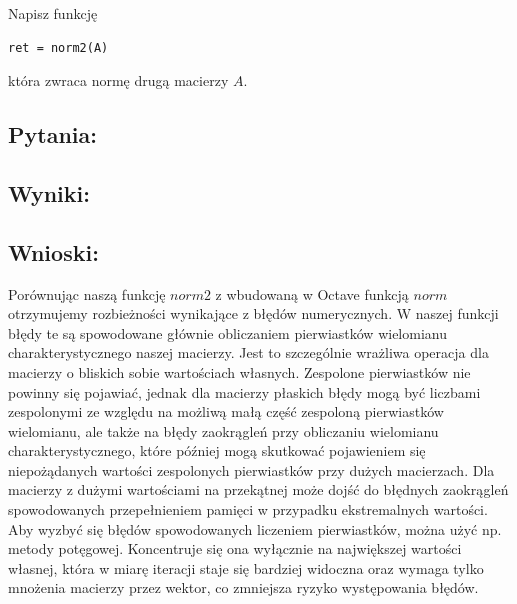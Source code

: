 \documentclass[a4paper, 11pt]{article}
\begin{document}
Napisz funkcję
\begin{center}
\begin{verbatim}
ret = norm2(A)
\end{verbatim}
\end{center}
która zwraca normę drugą macierzy \( A \).
\subsection{Pytania:} 

\subsection{Wyniki:} 

\subsection{Wnioski:}
Porównując naszą funkcję $norm2$ z wbudowaną w Octave funkcją $norm$ otrzymujemy rozbieżności wynikające z błędów numerycznych. W naszej funkcji błędy te są spowodowane głównie obliczaniem pierwiastków wielomianu charakterystycznego naszej macierzy. Jest to szczególnie wrażliwa operacja dla macierzy o bliskich sobie wartościach własnych. Zespolone pierwiastków nie powinny się pojawiać, jednak dla macierzy płaskich błędy mogą być liczbami zespolonymi ze względu na możliwą małą część zespoloną pierwiastków wielomianu, ale także na błędy zaokrągleń przy obliczaniu wielomianu charakterystycznego, które później mogą skutkować pojawieniem się niepożądanych wartości zespolonych pierwiastków przy dużych macierzach. Dla macierzy z dużymi wartościami na przekątnej może dojść do błędnych zaokrągleń spowodowanych przepełnieniem pamięci w przypadku ekstremalnych wartości. Aby wyzbyć się błędów spowodowanych liczeniem pierwiastków, można użyć np. metody potęgowej. Koncentruje się ona wyłącznie na największej wartości własnej, która w miarę iteracji staje się bardziej widoczna oraz wymaga tylko mnożenia macierzy przez wektor, co zmniejsza ryzyko występowania błędów. 
\end{document}
